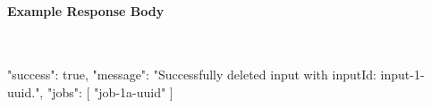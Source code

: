 \paragraph{Example Response Body} \mbox{}\\[\codeheaderspace]
\begin{jsoncode}
{
  "success": true,
  "message": "Successfully deleted input with inputId: input-1-uuid.",
  "jobs": [
    "job-1a-uuid"
  ]
}
\end{jsoncode}
